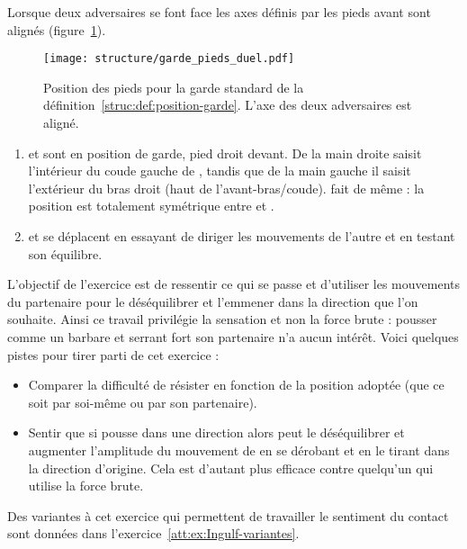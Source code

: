 Lorsque deux adversaires se font face les axes définis par les pieds avant sont alignés (figure~\ref{struc:fig:garde-pieds-duel}).

\begin{figure}[ht]
	\centering
	\texttt{[image: structure/garde\_pieds\_duel.pdf]}
	\caption{Position des pieds pour la garde standard de la définition~\ref{struc:def:position-garde}.
	L'axe des deux adversaires est aligné.}
	\label{struc:fig:garde-pieds-duel}
\end{figure}


\begin{exercice}
\label{struc:ex:Ingulf}


\begin{enumerate}
	\item \A et \D sont en position de garde, pied droit devant.
	De la main droite \A saisit l'intérieur du coude gauche de \D, tandis que de la main gauche il saisit l'extérieur du bras droit (haut de l'avant-bras/coude).
	\D fait de même : la position est totalement symétrique entre \A et \D.
	
	\item \A et \D se déplacent en essayant de diriger les mouvements de l'autre et en testant son équilibre.
\end{enumerate}

L'objectif de l'exercice est de ressentir ce qui se passe et d'utiliser les mouvements du partenaire pour le déséquilibrer et l'emmener dans la direction que l'on souhaite.
Ainsi ce travail privilégie la sensation et non la force brute : pousser comme un barbare et serrant fort son partenaire n'a aucun intérêt.
Voici quelques pistes pour tirer parti de cet exercice :
\begin{itemize}
	\item Comparer la difficulté de résister en fonction de la position adoptée (que ce soit par soi-même ou par son partenaire).
	
	\item Sentir que si \A pousse dans une direction alors \D peut le déséquilibrer et augmenter l'amplitude du mouvement de \A en se dérobant et en le tirant dans la direction d'origine.
	Cela est d'autant plus efficace contre quelqu'un qui utilise la force brute.
\end{itemize}

Des variantes à cet exercice qui permettent de travailler le sentiment du contact sont données dans l'exercice~\ref{att:ex:Ingulf-variantes}.


\end{exercice}


